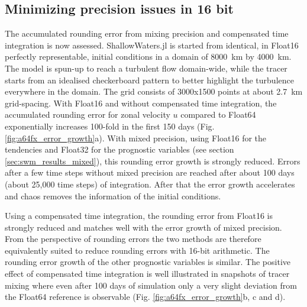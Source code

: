 \subsection{Minimizing precision issues in 16 bit}
The accumulated rounding error from mixing precision and compensated time integration is now assessed.
ShallowWaters.jl is started from identical, in Float16 perfectly representable, initial conditions in a domain of
8000~km by 4000~km. The model is spun-up to reach a turbulent flow domain-wide, while the tracer starts from
an idealised checkerboard pattern to better highlight the turbulence everywhere in the domain.  The grid consists
of 3000x1500 points at about 2.7~km grid-spacing. With Float16 and without compensated time integration,
the accumulated rounding error for zonal velocity $u$ compared to Float64 exponentially increases 100-fold in
the first 150 days (Fig. \ref{fig:a64fx_error_growth}a). With mixed precision, using Float16 for the tendencies
and Float32 for the prognostic variables (see section \ref{sec:swm_results_mixed}), this rounding error growth
is strongly reduced. Errors after a few time steps without mixed precision are reached after about 100 days
(about 25,000 time steps) of integration. After that the error growth accelerates and chaos removes the
information of the initial conditions.

Using a compensated time integration, the rounding error from Float16 is strongly reduced and matches well with the
error growth of mixed precision. From the perspective of rounding errors the two methods are therefore equivalently
suited to reduce rounding errors with 16-bit arithmetic. The rounding error growth of the other prognostic variables is
similar. The positive effect of compensated time integration is well illustrated in snapshots of tracer mixing where even
after 100 days of simulation only a very slight deviation from the Float64 reference is observable
(Fig. \ref{fig:a64fx_error_growth}b, c and d).

